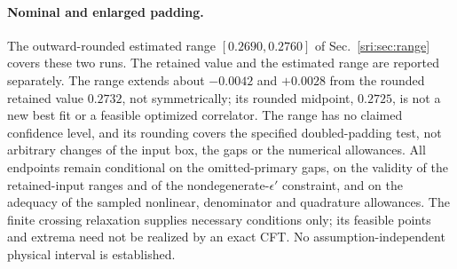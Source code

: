 \paragraph{Nominal and enlarged padding.} The outward-rounded estimated range $[0.2690,0.2760]$ of Sec.~\ref{sri:sec:range}
covers these two runs. The retained value and the estimated range are reported separately. The range extends about
$-0.0042$ and $+0.0028$ from the rounded retained value $0.2732$, not symmetrically; its rounded midpoint, $0.2725$, is
not a new best fit or a feasible optimized correlator. The range has no claimed confidence level, and its rounding
covers the specified doubled-padding test, not arbitrary changes of the input box, the gaps or the numerical
allowances. All endpoints remain conditional on the omitted-primary gaps, on the validity of the retained-input ranges
and of the nondegenerate-$\epsilon'$ constraint, and on the adequacy of the sampled nonlinear, denominator and
quadrature allowances. The finite crossing relaxation supplies necessary conditions only; its feasible points and
extrema need not be realized by an exact CFT. No assumption-independent physical interval is established.

